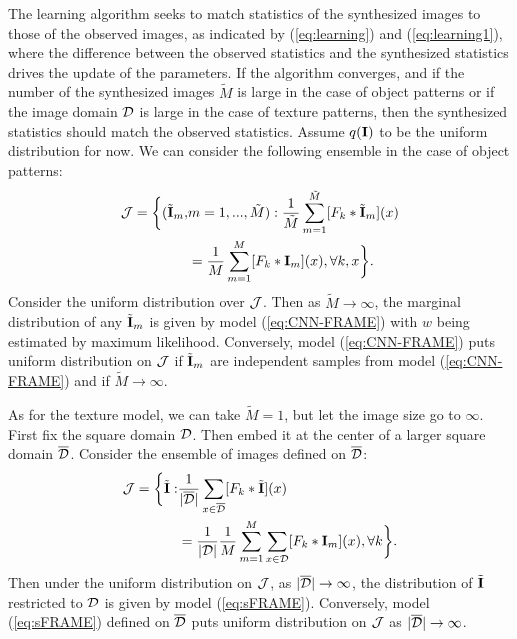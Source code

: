 \documentclass[letterpaper]{article}
\def\I{{\bf I}}
\def\tI{\tilde{\bf I}}
\begin{document}
 The learning algorithm seeks to match statistics of the synthesized images to those of the observed images, as indicated by (\ref{eq:learning}) and (\ref{eq:learning1}), where the difference between the observed statistics and the synthesized statistics drives the update of the parameters. If the algorithm converges, and if the number of the synthesized images $\tilde{M}$ is large in the case of object patterns or if the image domain ${\cal D}$ is large in the case of  texture patterns, then the synthesized statistics should match the observed statistics. Assume $q(\I)$ to be the uniform distribution for now. We can consider the following ensemble in the case of object patterns: 
 \begin{equation}
 \begin{aligned}
     {\cal J} = \bigg\{(\tilde{\I}_m, & m = 1, ..., \tilde{M}):                
    \frac{1}{\tilde{M}} \sum_{m=1}^{\tilde{M}} [F_k *\tI_m](x)\\
    & =  \frac{1}{M} \sum_{m=1}^{M} [F_k *\I_m](x), \forall k, x \bigg\}. 
  \end{aligned}
  \label{eq:Julesz1}
 \end{equation}     
Consider the uniform distribution over ${\cal J}$. Then as $\tilde{M} \rightarrow \infty$, the marginal distribution of any $\tilde{\I}_m$ is given by model (\ref{eq:CNN-FRAME}) with $w$ being estimated by maximum likelihood.  Conversely, model (\ref{eq:CNN-FRAME})  puts uniform distribution on ${\cal J}$ if $\tilde{\I}_m$ are independent samples from model (\ref{eq:CNN-FRAME}) and if $\tilde{M} \rightarrow \infty$. 

As for the texture model, we can take $\tilde{M} = 1$, but let the image size go to $\infty$. First fix the square domain ${\cal D}$. Then embed it at the center of a larger square domain $\overline{\cal D}$. Consider the ensemble of images defined on $\overline{\cal D}$: 
 \begin{equation}
 \begin{aligned}
     {\cal J} = \bigg\{\tilde{\I}:                
   &\frac{1}{|\overline{\cal D}|}\sum_{x \in \overline{\cal D}} [F_k *\tI](x) \\&=  \frac{1}{|{\cal D}|} \frac{1}{M} \sum_{m=1}^{M} \sum_{x \in {\cal D}}  [F_k *\I_m](x), \forall k \bigg\}. 
  \end{aligned}
  \label{eq:Julesz2}
 \end{equation}     
Then under the uniform distribution on ${\cal J}$, as $|\overline{\cal D}| \rightarrow \infty$, the distribution of $\tilde{\I}$ restricted to ${\cal D}$ is given by model (\ref{eq:sFRAME}). Conversely, model (\ref{eq:sFRAME}) defined on $\overline{\cal D}$ puts uniform distribution on ${\cal J}$ as $|\overline{\cal D}| \rightarrow \infty$. 
\end{document}
